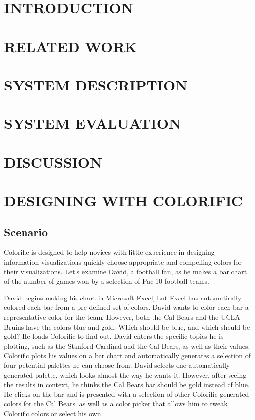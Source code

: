 \documentclass{article}
\newcommand{\system}{Colorific\xspace}
\begin{document}



\section{INTRODUCTION}


\section{RELATED WORK}

\section{SYSTEM DESCRIPTION}

\section{SYSTEM EVALUATION}

\section{DISCUSSION}

\section{DESIGNING WITH COLORIFIC}
\subsection{Scenario}
\system is designed to help novices with little experience in designing information visualizations quickly choose appropriate and compelling colors for their visualizations. Let's examine David, a football fan, as he makes a bar chart of the number of games won by a selection of Pac-10 football teams. 

David begins making his chart in Microsoft Excel, but Excel has automatically colored each bar from a pre-defined set of colors. David wants to color each bar a representative color for the team. However, both the Cal Bears and the UCLA Bruins have the colors blue and gold. Which should be blue, and which should be gold? He loads \system to find out. David enters the specific topics he is plotting, such as the Stanford Cardinal and the Cal Bears, as well as their values. \system plots his values on a bar chart and automatically generates a selection of four potential palettes he can choose from. David selects one automatically generated palette, which looks almost the way he wants it. However, after seeing the results in context, he thinks the Cal Bears bar should be gold instead of blue. He clicks on the bar and is presented with a selection of other \system generated colors for the Cal Bears, as well as a color picker that allows him to tweak \system colors or select his own. 
\end{document}
